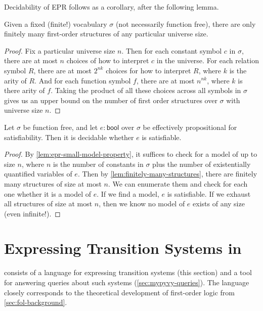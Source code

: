 Decidability of EPR follows as a corollary, after the following lemma.
\begin{lemma}\label{lem:finitely-many-structures}
  Given a fixed (finite!) vocabulary $\sigma$ (not necessarily function free),
  there are only finitely many first-order structures of any particular universe size.
\end{lemma}
\begin{proof}
  Fix a particular universe size $n$. Then for each constant symbol $c$ in
  $\sigma$, there are at most $n$ choices of how to interpret $c$ in the universe.
  For each relation symbol $R$, there are at most $2^{nk}$ choices for how to interpret $R$, where $k$ is the arity of $R$.
  And for each function symbol $f$, there are at most $n^{nk}$, where $k$ is there arity of $f$.
  Taking the product of all these choices across all symbols in $\sigma$ gives us an upper bound on the number of first order structures
  over $\sigma$ with universe size $n$.
\end{proof}

\begin{theorem}
  Let $\sigma$ be function free,
  and let $e : \mathsf{bool}$ over $\sigma$ be effectively propositional for satisfiability.
  Then it is decidable whether $e$ is satisfiable.
\end{theorem}
\begin{proof}
  By \cref{lem:epr-small-model-property}, it suffices to check for a model of up to size $n$,
  where $n$ is the number of constants in $\sigma$
  plus the number of existentially quantified variables of $e$.
  Then by \cref{lem:finitely-many-structures},
  there are finitely many structures of size at most $n$.
  We can enumerate them and check for each one
  whether it is a model of $e$.
  If we find a model, $e$ is satisfiable.
  If we exhaust all structures of size at most $n$,
  then we know no model of $e$ exists of any size (even infinite!).
\end{proof}



\section{Expressing Transition Systems in \mypyvy}

\mypyvy consists of a language for expressing transition systems (this section)
  and a tool for answering queries about such systems (\cref{sec:mypyvy-queries}).
The \mypyvy language closely corresponds to
  the theoretical development of first-order logic from \cref{sec:fol-background}.

